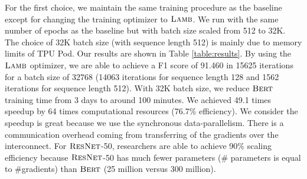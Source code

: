

For the first choice, we maintain the same training procedure as the baseline except for changing the training optimizer to $\textsc{Lamb}$. We run with the same number of epochs as the baseline but with batch size scaled from 512 to 32K. The choice of 32K batch size (with sequence length 512) is mainly due to memory limits of TPU Pod. Our results are shown in Table \ref{table:results}. By using the $\textsc{Lamb}$ optimizer, we are able to achieve a F1 score of 91.460 in 15625 iterations for a batch size of 32768 (14063 iterations for sequence length 128 and 1562 iterations for sequence length 512).
With 32K batch size, we reduce $\textsc{Bert}$ training time from 3 days to around 100 minutes. 
We achieved 49.1 times speedup by 64 times computational resources (76.7\% efficiency).
We consider the speedup is great because we use the synchronous data-parallelism. 
There is a communication overhead coming from transferring of the gradients over the interconnect.
For $\textsc{ResNet}$-50, researchers are able to achieve 90\% scaling efficiency because $\textsc{ResNet}$-50 has much fewer parameters (\# parameters is equal to \#gradients) than $\textsc{Bert}$ (25 million versus 300 million).

